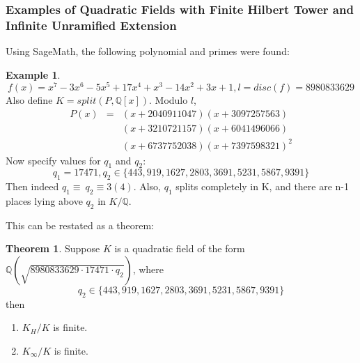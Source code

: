 \documentclass[12pt]{extarticle}
\newcommand{\Q}{\mathbb{Q}}
\newcommand{\<}{\langle}
\renewcommand{\>}{\rangle}
\theoremstyle{definition}
\newtheorem{theorem}{Theorem}
\newtheorem*{example}{Example}
\begin{document}
\subsubsection*{Examples of Quadratic Fields with Finite Hilbert Tower and Infinite Unramified Extension}
Using SageMath, the following polynomial and primes were found: 
\begin{example}
\begin{equation}
    f(x) = x^7-3x^6-5x^5+17x^4+x^3-14x^2+3x+1, l= disc(f)=8980833629
\end{equation}
Also define $K=split(P,\Q[x])$. Modulo $l$,
\begin{eqnarray*}
        P(x)&=&(x+2040911047)(x+3097257563)\\ & & {} (x+3210721157)(x+6041496066)\\ & & {}(x+6737752038)(x+7397598321)^2
\end{eqnarray*}
Now specify values for $q_1$ and $q_2$:
\begin{equation}
    q_1=17471,q_2\in\{443,919,1627,2803,3691,5231,5867,9391\}
\end{equation}
Then indeed $q_1\equiv\:q_2\equiv3(4)$. Also, $q_1$ splits completely in K, and there are n-1 places lying above $q_2$ in $K/\Q$.
\end{example}
This can be restated as a theorem:
\begin{theorem}
    Suppose $K$ is a quadratic field of the form $\Q(\sqrt{8980833629 \cdot 17471 \cdot q_2})$, where 
    \begin{equation}
        q_2\in\{443,919,1627,2803,3691,5231,5867,9391\}
    \end{equation}
    then \begin{enumerate}
        \item $K_H/K$ is finite.
        \item $K_\infty/K$ is finite.
    \end{enumerate}
\end{theorem}
\end{document}
